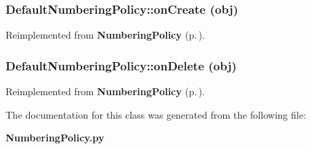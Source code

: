 \subsubsection{\setlength{\rightskip}{0pt plus 5cm}Default\-Numbering\-Policy::on\-Create (obj)}\label{classDefaultNumberingPolicy_DefaultNumberingPolicya1}




Reimplemented from {\bf Numbering\-Policy} {\rm (p.\,\pageref{classNumberingPolicy_NumberingPolicya1})}.
\subsubsection{\setlength{\rightskip}{0pt plus 5cm}Default\-Numbering\-Policy::on\-Delete (obj)}\label{classDefaultNumberingPolicy_DefaultNumberingPolicya2}




Reimplemented from {\bf Numbering\-Policy} {\rm (p.\,\pageref{classNumberingPolicy_NumberingPolicya2})}.

The documentation for this class was generated from the following file:\begin{CompactItemize}
\item 
{\bf Numbering\-Policy.py}\end{CompactItemize}

